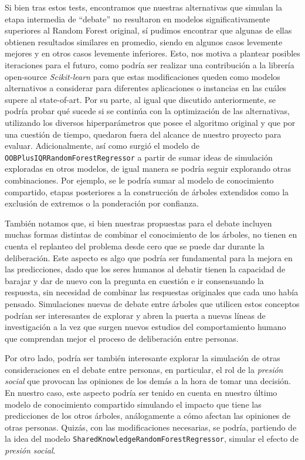 Si bien tras estos tests, encontramos que nuestras alternativas que simulan la etapa intermedia de “debate” no resultaron en modelos significativamente superiores al Random Forest original, sí pudimos encontrar que algunas de ellas obtienen resultados similares en promedio, siendo en algunos casos levemente mejores y en otros casos levemente inferiores. Esto, nos motiva a plantear posibles iteraciones para el futuro, como podría ser realizar una contribución a la librería open-source \textit{Scikit-learn} para que estas modificaciones queden como modelos alternativos a considerar para diferentes aplicaciones o instancias en las cuáles supere al state-of-art. Por su parte, al igual que discutido anteriormente, se podría probar qué sucede si se continúa con la optimización de las alternativas, utilizando los diversos hiperparámetros que posee el algoritmo original y que por una cuestión de tiempo, quedaron fuera del alcance de nuestro proyecto para evaluar. Adicionalmente, así como surgió el modelo de \texttt{OOBPlusIQRRandomForestRegressor} a partir de sumar ideas de simulación exploradas en otros modelos, de igual manera se podría seguir explorando otras combinaciones. Por ejemplo, se le podría sumar al modelo de conocimiento compartido, etapas posteriores a la construcción de árboles extendidos como la exclusión de extremos o la ponderación por confianza. 

También notamos que, si bien nuestras propuestas para el debate incluyen muchas formas distintas de combinar el conocimiento de los árboles, no tienen en cuenta el replanteo del problema desde cero que se puede dar durante la deliberación. Este aspecto es algo que podría ser fundamental para la mejora en las predicciones, dado que los seres humanos al debatir tienen la capacidad de barajar y dar de nuevo con la pregunta en cuestión e ir consensuando la respuesta, sin necesidad de combinar las respuestas originales que cada uno había pensado. Simulaciones nuevas de debate entre árboles que utilicen estos conceptos podrían ser interesantes de explorar y abren la puerta a nuevas líneas de investigación a la vez que surgen nuevos estudios del comportamiento humano que comprendan mejor el proceso de deliberación entre personas.

Por otro lado, podría ser también interesante explorar la simulación de otras consideraciones en el debate entre personas, en particular, el rol de la \textit{presión social} que provocan las opiniones de los demás a la hora de tomar una decisión. En nuestro caso, este aspecto podría ser tenido en cuenta en nuestro último modelo de conocimiento compartido simulando el impacto que tiene las predicciones de los otros árboles, análogamente a cómo afectan las opiniones de otras personas. Quizás, con las modificaciones necesarias, se podría, partiendo de la idea del modelo \texttt{SharedKnowledgeRandomForestRegressor}, simular el efecto de \textit{presión social}.


